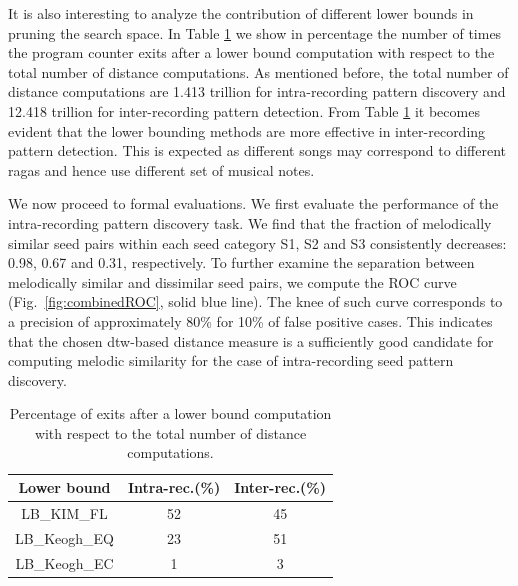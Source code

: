 It is also interesting to analyze the contribution of different lower bounds in pruning the search space. In Table \ref{tab:computationalStats} we show in percentage the number of times the program counter exits after a lower bound computation with respect to the total number of distance computations. As mentioned before, the total number of distance computations are 1.413 trillion for intra-recording pattern discovery and 12.418 trillion for inter-recording pattern detection. From Table \ref{tab:computationalStats} it becomes evident that the lower bounding methods are more effective in inter-recording pattern detection. This is expected as different songs may correspond to different \glspl{raga} and hence use different set of musical notes.


We now proceed to formal evaluations. We first evaluate the performance of the intra-recording pattern discovery task. We find that the fraction of melodically similar seed pairs within each seed category S1, S2 and S3 consistently decreases: 0.98, 0.67 and 0.31, respectively. To further examine the separation between melodically similar and dissimilar seed pairs, we compute the ROC curve (Fig.~\ref{fig:combinedROC}, solid blue line). The knee of such curve corresponds to a precision of approximately 80\% for 10\% of false positive cases. This indicates that the chosen \gls{dtw}-based distance measure is a sufficiently good candidate for computing melodic similarity for the case of intra-recording seed pattern discovery. 

\begin{table} 
	\centering
	\caption{Percentage of exits after a lower bound computation with respect to the total number of distance computations.}
	\label{tab:computationalStats}
	
	\begin{tabular}{ c | c c }
		
		\hline\hline
		Lower bound   	& Intra-rec.(\%)		&	Inter-rec.(\%) \\	
		
		\hline 
		LB\_KIM\_FL   	& 52	&	45 \\	
		LB\_Keogh\_EQ   	& 23	&	51 \\
		LB\_Keogh\_EC   		& 1	&	3 \\
		\hline\hline
		
	\end{tabular}
	
\end{table}



